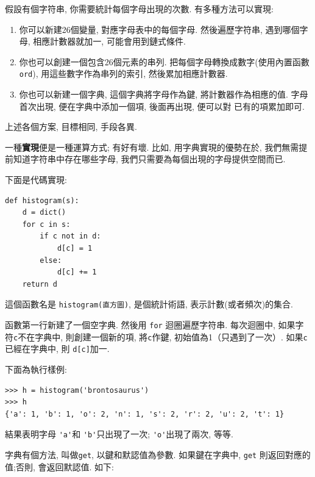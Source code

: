 \documentclass[10pt]{book}
\begin{document}
假設有個字符串, 你需要統計每個字母出現的次數. 
有多種方法可以實現:

\begin{enumerate}

\item 你可以新建26個變量, 對應字母表中的每個字母. 
然後遍歷字符串, 遇到哪個字母, 相應計數器就加一, 
可能會用到鏈式條件. 

\item 你也可以創建一個包含26個元素的串列. 
把每個字母轉換成數字(使用內置函數{\tt ord}), 用這些數字作為串列的索引, 
然後累加相應計數器. 

\item 你也可以新建一個字典, 這個字典將字母作為鍵, 
將計數器作為相應的值. 
字母首次出現, 便在字典中添加一個項, 後面再出現, 便可以對
已有的項累加即可. 

\end{enumerate}

上述各個方案, 目標相同, 手段各異.

一種{\bf 實現}便是一種運算方式; 有好有壞. 
比如, 用字典實現的優勢在於, 我們無需提前知道字符串中存在哪些字母, 
我們只需要為每個出現的字母提供空間而已. 

下面是代碼實現:

\begin{verbatim}
def histogram(s):
    d = dict()
    for c in s:
        if c not in d:
            d[c] = 1
        else:
            d[c] += 1
    return d
\end{verbatim}
%
這個函數名是 {\tt histogram(直方圖)}, 是個統計術語, 表示計數(或者頻次)的集合.

函數第一行新建了一個空字典. 
然後用 {\tt for} 迴圈遍歷字符串. 每次迴圈中, 如果字符{\tt c}不在字典中, 
則創建一個新的項, 將{\tt c}作鍵, 初始值為1（只遇到了一次）. 
如果{\tt c} 已經在字典中, 則 {\tt d[c]}加一.

下面為執行樣例:

\begin{verbatim}
>>> h = histogram('brontosaurus')
>>> h
{'a': 1, 'b': 1, 'o': 2, 'n': 1, 's': 2, 'r': 2, 'u': 2, 't': 1}
\end{verbatim}
%

結果表明字母 \verb"'a'"和 \verb"'b'"只出現了一次;
\verb"'o'"出現了兩次, 等等. 


字典有個方法, 叫做{\tt get}, 
以鍵和默認值為參數. 
如果鍵在字典中, {\tt get} 則返回對應的值;否則, 會返回默認值. 
如下:
\end{document}

